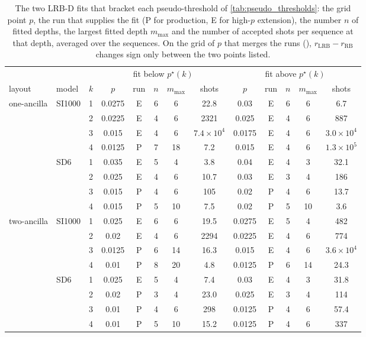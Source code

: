 \begin{table}[tp]
  \centering
  \footnotesize
  \setlength{\tabcolsep}{4pt}
  \begin{tabular}{llc|ccccc|ccccc}
    \hline
    & & & \multicolumn{5}{c|}{fit below $p^\star(k)$} & \multicolumn{5}{c}{fit above $p^\star(k)$} \\
    layout & model & $k$ & $p$ & run & $n$ & $m_{\max}$ & shots & $p$ & run & $n$ & $m_{\max}$ & shots \\
    \hline
    one-ancilla & SI1000 & 1 & 0.0275 & E & 6 & 6 & 22.8 & 0.03 & E & 6 & 6 & 6.7 \\
     &  & 2 & 0.0225 & E & 4 & 6 & 2321 & 0.025 & E & 4 & 6 & 887 \\
     &  & 3 & 0.015 & E & 4 & 6 & $7.4\times10^{4}$ & 0.0175 & E & 4 & 6 & $3.0\times10^{4}$ \\
     &  & 4 & 0.0125 & P & 7 & 18 & 7.2 & 0.015 & E & 4 & 6 & $1.3\times10^{5}$ \\
    \hline
     & SD6 & 1 & 0.035 & E & 5 & 4 & 3.8 & 0.04 & E & 4 & 3 & 32.1 \\
     &  & 2 & 0.025 & E & 4 & 6 & 10.7 & 0.03 & E & 3 & 4 & 186 \\
     &  & 3 & 0.015 & P & 4 & 6 & 105 & 0.02 & P & 4 & 6 & 13.7 \\
     &  & 4 & 0.015 & P & 5 & 10 & 7.5 & 0.02 & P & 5 & 10 & 3.6 \\
    \hline
    two-ancilla & SI1000 & 1 & 0.025 & E & 6 & 6 & 19.5 & 0.0275 & E & 5 & 4 & 482 \\
     &  & 2 & 0.02 & E & 4 & 6 & 2294 & 0.0225 & E & 4 & 6 & 774 \\
     &  & 3 & 0.0125 & P & 6 & 14 & 16.3 & 0.015 & E & 4 & 6 & $3.6\times10^{4}$ \\
     &  & 4 & 0.01 & P & 8 & 20 & 4.8 & 0.0125 & P & 6 & 14 & 24.3 \\
    \hline
     & SD6 & 1 & 0.025 & E & 5 & 4 & 7.4 & 0.03 & E & 4 & 3 & 31.8 \\
     &  & 2 & 0.02 & P & 3 & 4 & 23.0 & 0.025 & E & 3 & 4 & 114 \\
     &  & 3 & 0.01 & P & 4 & 6 & 298 & 0.0125 & P & 4 & 6 & 57.4 \\
     &  & 4 & 0.01 & P & 5 & 10 & 15.2 & 0.0125 & P & 4 & 6 & 337 \\
    \hline
  \end{tabular}
  \caption{The two LRB-D fits that bracket each pseudo-threshold of \autoref{tab:pseudo_thresholds}: the grid point $p$, the run that supplies the fit (P for production, E for high-$p$ extension), the number $n$ of fitted depths, the largest fitted depth $m_{\max}$ and the number of accepted shots per sequence at that depth, averaged over the sequences. On the grid of $p$ that merges the runs (), $r_{\mathrm{LRB}} - r_{\mathrm{RB}}$ changes sign only between the two points listed.}
  \label{tab:brackets}
\end{table}

